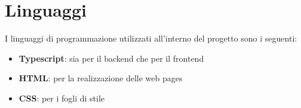 %
%
%
\section{Linguaggi}

I linguaggi di programmazione utilizzati all'interno del progetto sono i seguenti:

\begin{itemize}
    \item \textbf{Typescript}: sia per il backend che per il frontend

    \item \textbf{HTML}: per la realizzazione delle web pages

    \item \textbf{CSS}: per i fogli di stile 
\end{itemize}
